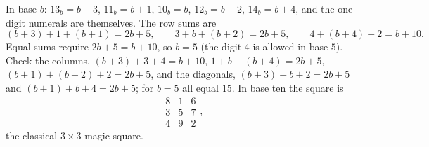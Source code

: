 In base $b$: $13_b=b+3$, $11_b=b+1$, $10_b=b$, $12_b=b+2$, $14_b=b+4$, and the one-digit numerals are themselves. The row sums are
\[
(b+3)+1+(b+1)=2b+5,\qquad 3+b+(b+2)=2b+5,\qquad 4+(b+4)+2=b+10 .
\]
Equal sums require $2b+5=b+10$, so $b=\boxed{5}$ (the digit $4$ is allowed in base $5$). Check the columns, $(b+3)+3+4=b+10$, $1+b+(b+4)=2b+5$, $(b+1)+(b+2)+2=2b+5$, and the diagonals, $(b+3)+b+2=2b+5$ and $(b+1)+b+4=2b+5$; for $b=5$ all equal $15$. In base ten the square is
\[
\begin{array}{ccc}8&1&6\\3&5&7\\4&9&2\end{array},
\]
the classical $3\times3$ magic square.
